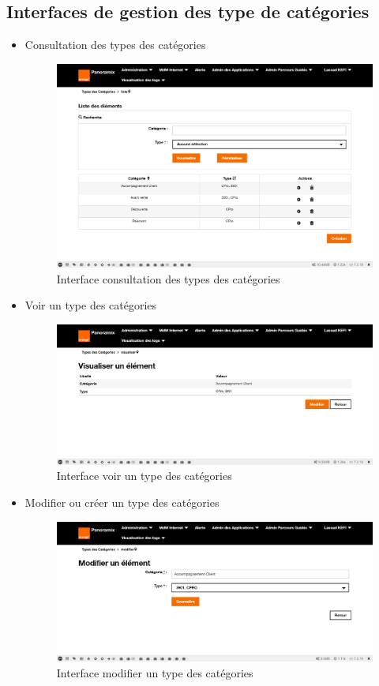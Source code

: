\subsection{Interfaces de gestion des type de catégories}

\begin{itemize}
	\item Consultation des types des catégories
	\begin{figure}[H]
		\centering
		\includegraphics[width=0.6\linewidth]{img/screenshots/categorie-type/index}
		\caption[Interface consultation des types des catégories]{Interface consultation des types des catégories}
		\label{fig:index-tc}
	\end{figure}
	\newpage
	\item Voir un type des catégories
	\begin{figure}[H]
		\centering
		\includegraphics[width=0.7\linewidth]{img/screenshots/categorie-type/view}
		\caption[Interface voir un type des catégories]{Interface voir un type des catégories}
		\label{fig:view-tc}
	\end{figure}
	
	\item Modifier ou créer un type des catégories
	\begin{figure}[H]
		\centering
		\includegraphics[width=0.7\linewidth]{img/screenshots/categorie-type/create-edit}
		\caption[Interface modifier un type des catégories]{Interface modifier un type des catégories}
		\label{fig:edit-tc}
	\end{figure}


\end{itemize}
